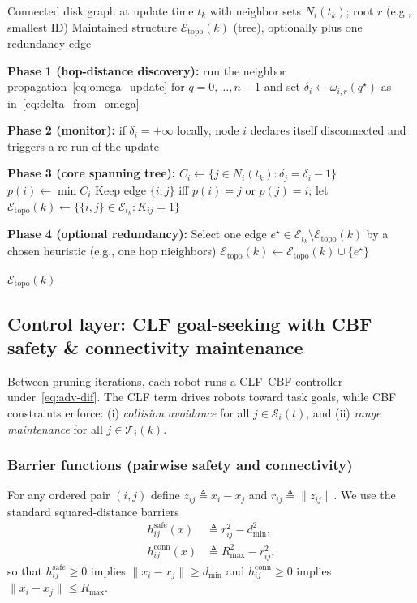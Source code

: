 \documentclass[conference]{IEEEconf}
\theoremstyle{plain}
\begin{document}
\begin{algorithm}[t]
\caption{Algorithm A: Four-phase distributed pruning with optional redundancy edge}
\label{alg:four_phase_pruning}
\begin{algorithmic}[1]
\REQUIRE Connected disk graph at update time $t_k$ with neighbor sets $N_i(t_k)$; root $r$ (e.g., smallest ID)
\ENSURE Maintained structure $\mathcal{E}_{\mathrm{topo}}(k)$ (tree), optionally plus one redundancy edge

\STATE \textbf{Phase 1 (hop-distance discovery):} run the neighbor propagation~\eqref{eq:omega_update} for $q=0,\dots,n-1$ and set $\delta_i\leftarrow \omega_{i,r}(q^\star)$ as in~\eqref{eq:delta_from_omega}

\STATE \textbf{Phase 2 (monitor):} if $\delta_i=+\infty$ locally, node $i$ declares itself disconnected and triggers a re-run of the update

\STATE \textbf{Phase 3 (core spanning tree):}
    \STATE $C_i \leftarrow \{j\in N_i(t_k): \delta_j=\delta_i-1\}$
    \STATE $p(i)\leftarrow \min C_i$
\ENDFOR
\STATE Keep edge $\{i,j\}$ iff $p(i)=j$ or $p(j)=i$; let $\mathcal{E}_{\mathrm{topo}}(k)\leftarrow \{\{i,j\}\in \mathcal{E}_{t_k}: K_{ij}=1\}$

\STATE \textbf{Phase 4 (optional redundancy):}
\STATE Select one edge $e^\star\in \mathcal{E}_{t_k}\setminus \mathcal{E}_{\mathrm{topo}}(k)$ by a chosen heuristic (e.g., one hop nieighbors)
\STATE $\mathcal{E}_{\mathrm{topo}}(k)\leftarrow \mathcal{E}_{\mathrm{topo}}(k)\cup \{e^\star\}$

\RETURN $\mathcal{E}_{\mathrm{topo}}(k)$
\end{algorithmic}
\end{algorithm}

\subsection{Control layer: CLF goal-seeking with CBF safety \& connectivity maintenance}
Between pruning iterations, each robot runs a CLF--CBF controller under~\eqref{eq:adv-dif}.
The CLF term drives robots toward task goals, while CBF constraints enforce:
(i) \emph{collision avoidance} for all $j\in\mathcal{S}_i(t)$, and
(ii) \emph{range maintenance} for all $j\in\mathcal{T}_i(k)$.

\subsubsection{Barrier functions (pairwise safety and connectivity)}
For any ordered pair $(i,j)$ define $z_{ij}\triangleq x_i-x_j$ and $r_{ij}\triangleq \|z_{ij}\|$.
We use the standard squared-distance barriers
\begin{align}
h^{\mathrm{safe}}_{ij}(x) &\triangleq r_{ij}^2 - d_{\min}^2,
\label{eq:h_safe}\\
h^{\mathrm{conn}}_{ij}(x) &\triangleq R_{\max}^2 - r_{ij}^2,
\label{eq:h_conn}
\end{align}
so that $h^{\mathrm{safe}}_{ij}\ge 0$ implies $\|x_i-x_j\|\ge d_{\min}$ and
$h^{\mathrm{conn}}_{ij}\ge 0$ implies $\|x_i-x_j\|\le R_{\max}$.
\end{document}
